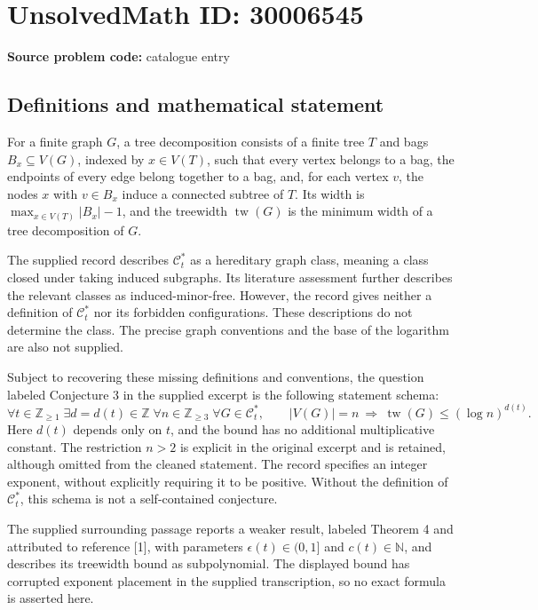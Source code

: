 \documentclass[11pt]{article}
\newcommand{\N}{\mathbb{N}}
\newcommand{\Z}{\mathbb{Z}}
\begin{document}
\section*{UnsolvedMath ID: 30006545}
\textbf{Source problem code:} catalogue entry
\subsection{Definitions and mathematical statement}
For a finite graph \(G\), a tree decomposition consists of a finite tree \(T\) and bags \(B_x\subseteq V(G)\), indexed by \(x\in V(T)\), such that every vertex belongs to a bag, the endpoints of every edge belong together to a bag, and, for each vertex \(v\), the nodes \(x\) with \(v\in B_x\) induce a connected subtree of \(T\). Its width is \(\max_{x\in V(T)}|B_x|-1\), and the treewidth \(\operatorname{tw}(G)\) is the minimum width of a tree decomposition of \(G\).

The supplied record describes \(\mathcal C_t^*\) as a hereditary graph class, meaning a class closed under taking induced subgraphs. Its literature assessment further describes the relevant classes as induced-minor-free. However, the record gives neither a definition of \(\mathcal C_t^*\) nor its forbidden configurations. These descriptions do not determine the class. The precise graph conventions and the base of the logarithm are also not supplied.

Subject to recovering these missing definitions and conventions, the question labeled Conjecture 3 in the supplied excerpt is the following statement schema:
\[
\forall t\in\Z_{\geq 1}\;\exists d=d(t)\in\Z\;\forall n\in\Z_{\geq 3}\;\forall G\in\mathcal C_t^*,\qquad
|V(G)|=n\ \Longrightarrow\ \operatorname{tw}(G)\leq (\log n)^{d(t)}.
\]
Here \(d(t)\) depends only on \(t\), and the bound has no additional multiplicative constant. The restriction \(n>2\) is explicit in the original excerpt and is retained, although omitted from the cleaned statement. The record specifies an integer exponent, without explicitly requiring it to be positive. Without the definition of \(\mathcal C_t^*\), this schema is not a self-contained conjecture.

The supplied surrounding passage reports a weaker result, labeled Theorem 4 and attributed to reference [1], with parameters \(\epsilon(t)\in(0,1]\) and \(c(t)\in\N\), and describes its treewidth bound as subpolynomial. The displayed bound has corrupted exponent placement in the supplied transcription, so no exact formula is asserted here.
\end{document}
